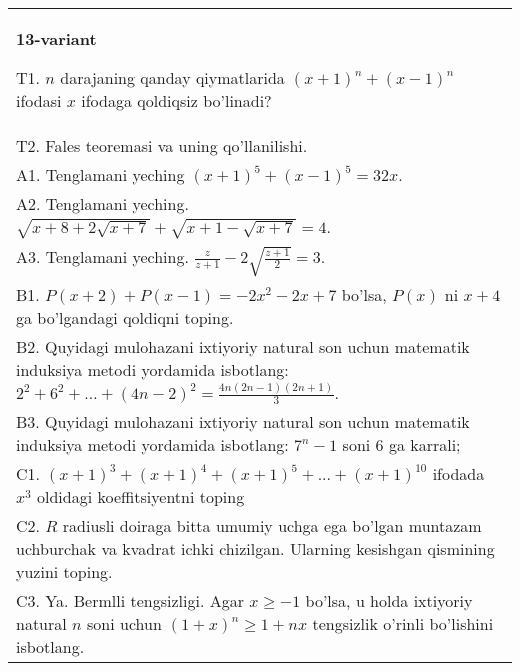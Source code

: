 \documentclass{article}
\begin{document}
\begin{tabular}{m{17cm}}
\textbf{13-variant}
\newline

T1. \(n\) darajaning qanday qiymatlarida \((x + 1)^{n} + (x - 1)^{n}\) ifodasi \(x\) ifodaga qoldiqsiz bo'linadi? \\
T2. Fales teoremasi va uning qo'llanilishi. \\
A1. Tenglamani yeching \((x + 1)^{5} + (x - 1)^{5} = 32x\). \\
A2. Tenglamani yeching. \(\sqrt{x + 8 + 2\sqrt{x + 7}} + \sqrt{x + 1 - \sqrt{x + 7}} = 4\). \\
A3. Tenglamani yeching. \(\frac{z}{z + 1} - 2\sqrt{\frac{z + 1}{2}} = 3\). \\
B1. \(P(x + 2) + P(x - 1) = - 2x^{2} - 2x + 7\) bo'lsa, \(P(x)\) ni \(x + 4\) ga bo'lgandagi qoldiqni toping. \\
B2. Quyidagi mulohazani ixtiyoriy natural son uchun matematik induksiya metodi yordamida isbotlang: \(2^{2} + 6^{2} + \ldots + (4n - 2)^{2} = \frac{4n(2n - 1)(2n + 1)}{3}\). \\
B3. Quyidagi mulohazani ixtiyoriy natural son uchun matematik induksiya metodi yordamida isbotlang: \(7^{n} - 1\) soni 6 ga karrali; \\
C1. \((x + 1)^{3} + (x + 1)^{4} + (x + 1)^{5} + ... + (x + 1)^{10}\) ifodada \(x^{3}\) oldidagi koeffitsiyentni toping \\
C2. \(R\) radiusli doiraga bitta umumiy uchga ega bo'lgan muntazam uchburchak va kvadrat ichki chizilgan. Ularning kesishgan qismining yuzini toping. \\
C3. Ya. Bermlli tengsizligi. Agar \(x \geq - 1\) bo'lsa, u holda ixtiyoriy natural \(n\) soni uchun \((1 + x)^{n} \geq 1 + nx\) tengsizlik o'rinli bo'lishini isbotlang. \\

\end{tabular}
\vspace{1cm}
\end{document}
